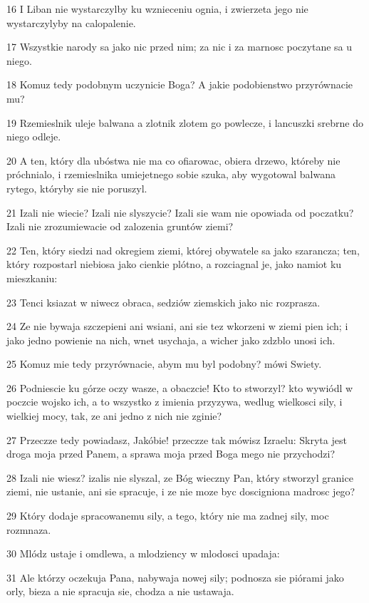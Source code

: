 \par 16 I Liban nie wystarczylby ku wznieceniu ognia, i zwierzeta jego nie wystarczylyby na calopalenie.
\par 17 Wszystkie narody sa jako nic przed nim; za nic i za marnosc poczytane sa u niego.
\par 18 Komuz tedy podobnym uczynicie Boga? A jakie podobienstwo przyrównacie mu?
\par 19 Rzemieslnik uleje balwana a zlotnik zlotem go powlecze, i lancuszki srebrne do niego odleje.
\par 20 A ten, który dla ubóstwa nie ma co ofiarowac, obiera drzewo, któreby nie próchnialo, i rzemieslnika umiejetnego sobie szuka, aby wygotowal balwana rytego, któryby sie nie poruszyl.
\par 21 Izali nie wiecie? Izali nie slyszycie? Izali sie wam nie opowiada od poczatku? Izali nie zrozumiewacie od zalozenia gruntów ziemi?
\par 22 Ten, który siedzi nad okregiem ziemi, której obywatele sa jako szarancza; ten, który rozpostarl niebiosa jako cienkie plótno, a rozciagnal je, jako namiot ku mieszkaniu:
\par 23 Tenci ksiazat w niwecz obraca, sedziów ziemskich jako nic rozprasza.
\par 24 Ze nie bywaja szczepieni ani wsiani, ani sie tez wkorzeni w ziemi pien ich; i jako jedno powienie na nich, wnet usychaja, a wicher jako zdzblo unosi ich.
\par 25 Komuz mie tedy przyrównacie, abym mu byl podobny? mówi Swiety.
\par 26 Podniescie ku górze oczy wasze, a obaczcie! Kto to stworzyl? kto wywiódl w poczcie wojsko ich, a to wszystko z imienia przyzywa, wedlug wielkosci sily, i wielkiej mocy, tak, ze ani jedno z nich nie zginie?
\par 27 Przeczze tedy powiadasz, Jakóbie! przeczze tak mówisz Izraelu: Skryta jest droga moja przed Panem, a sprawa moja przed Boga mego nie przychodzi?
\par 28 Izali nie wiesz? izalis nie slyszal, ze Bóg wieczny Pan, który stworzyl granice ziemi, nie ustanie, ani sie spracuje, i ze nie moze byc doscigniona madrosc jego?
\par 29 Który dodaje spracowanemu sily, a tego, który nie ma zadnej sily, moc rozmnaza.
\par 30 Mlódz ustaje i omdlewa, a mlodziency w mlodosci upadaja:
\par 31 Ale którzy oczekuja Pana, nabywaja nowej sily; podnosza sie piórami jako orly, bieza a nie spracuja sie, chodza a nie ustawaja.

